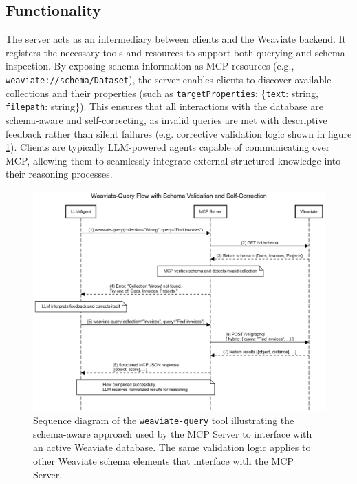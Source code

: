 \subsection{Functionality}
The server acts as an intermediary between clients and the Weaviate backend. It registers the necessary tools and resources to support both querying and schema inspection. By exposing schema information as MCP resources (e.g., \texttt{weaviate://schema/Dataset}), the server enables clients to discover available collections and their properties (such as \texttt{targetProperties}: \{\texttt{text}: string, \texttt{filepath}: string\}). This ensures that all interactions with the database are schema-aware and self-correcting, as invalid queries are met with descriptive feedback rather than silent failures (e.g. corrective validation logic shown in figure \ref{fig:sequence-diagram-weaviate-query}). Clients are typically \gls{LLM}-powered agents capable of communicating over \gls{MCP}, allowing them to seamlessly integrate external structured knowledge into their reasoning processes.


\begin{figure}
    \centering
    \includegraphics[width=1\linewidth]{Images/Sequence-diagram-Weaviate-Query.png}
   \caption{Sequence diagram of the \texttt{weaviate-query} tool illustrating the schema-aware approach used by the MCP Server to interface with an active Weaviate database. The same validation logic applies to other Weaviate schema elements that interface with the MCP Server.}
    \label{fig:sequence-diagram-weaviate-query}
\end{figure}






